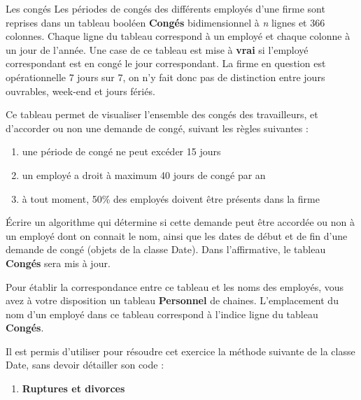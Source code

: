 \begin{Exercice}{Les congés}
	Les périodes de congés des différents employés d’une firme sont reprises
	dans un tableau booléen \textbf{Congés} bidimensionnel à \textit{n}
	lignes et 366 colonnes. Chaque ligne du tableau correspond à un employé
	et chaque colonne à un jour de l’année. Une case de ce tableau est mise
	à \textbf{vrai} si l’employé correspondant est en congé le jour
	correspondant. La firme en question est opérationnelle 7 jours sur 7,
	on n’y fait donc pas de distinction entre jours ouvrables, week-end et
	jours fériés.

	Ce tableau permet de visualiser l’ensemble des congés des travailleurs,
	et d’accorder ou non une demande de congé, suivant les règles suivantes :

	\liststyleWWviiiNumiv
	\begin{enumerate}
		\item 
			une période de congé ne peut excéder 15 jours
		\item 
			un employé a droit à maximum 40 jours de congé par an
		\item 
			à tout moment, 50\% des employés doivent être présents dans la firme
	\end{enumerate}
	
	Écrire un algorithme qui détermine si cette demande peut être accordée
	ou non à un employé dont on connait le nom, ainsi que les dates de
	début et de fin d’une demande de congé (objets de la classe Date). Dans
	l’affirmative, le tableau \textbf{Congés} sera mis à jour.

	Pour établir la correspondance entre ce tableau et les noms des
	employés, vous avez à votre disposition un tableau \textbf{Personnel}
	de chaines. L’emplacement du nom d’un employé dans ce tableau
	correspond à l’indice ligne du tableau \textbf{Congés}.

	Il est permis d’utiliser pour résoudre cet exercice la méthode suivante
	de la classe Date, sans devoir détailler son code :
	
\end{Exercice}

\liststyleExercice
\begin{enumerate}
\item {\sffamily\bfseries
Ruptures et divorces}
\end{enumerate}

